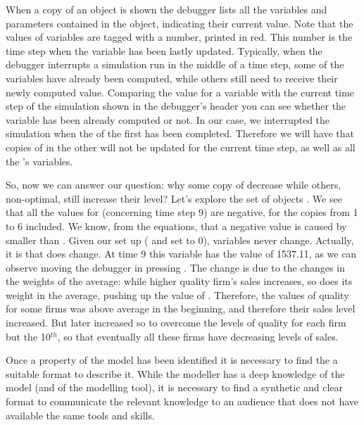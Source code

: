 \documentclass [11pt,a4paper] {book}
\begin{document}
When a copy of an object is shown the debugger lists all the variables and parameters
contained in the object, indicating their current value. Note that the values of
variables are tagged with a number, printed in red. This number is the time step when the
variable has been lastly updated. Typically, when the debugger interrupts a simulation
run in the middle of a time step, some of the variables have already been computed, while
others still need to receive their newly computed value. Comparing the value
 for a variable with the current time step of the simulation shown in
the debugger's header you can see whether the variable has been already computed or not.
In our case, we interrupted the simulation when the  of the first  has been completed. Therefore we will have that copies of  in the other  will not be updated for the current time step, as well as all the 's variables.


So, now we can answer our question: why some copy of  decrease while others,
non-optimal, still increase their level? Let's explore the set of objects . We see that all the values for  (concerning time step 9) are
negative, for the copies from 1 to 6 included. We know, from the equations, that a
negative value is caused by  smaller than . Given
our set up ( and  set to 0), variables  never
change. Actually, it is  that does change. At time 9 this variable
has the value of 1537.11, as we can observe moving the debugger in 
pressing . The change is due to the changes in the weights of the average: while
higher quality firm's sales increases, so does its weight in the average, pushing up the
value of . Therefore, the values of quality for some firms was above
average in the beginning, and therefore their sales level increased. But later
 increased so to overcome the levels of quality for each firm but
the 10$^{th}$, so that eventually all these firms have decreasing levels of sales.

Once a property of the model has been identified it is necessary to find the a suitable format to describe it. While the modeller has a deep knowledge of the model (and of the modelling tool), it is necessary to find a synthetic and clear format to communicate the relevant knowledge to an audience that does not have available the same tools and skills. 
\end{document}
